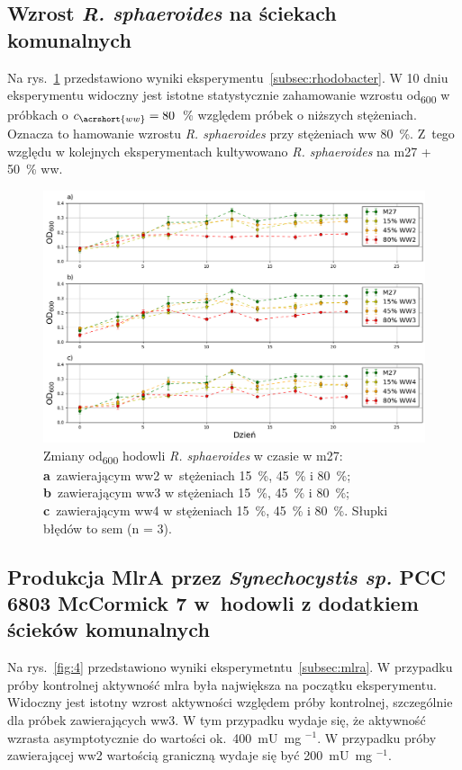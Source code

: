 \subsection{Wzrost \textit{R. sphaeroides} na ściekach komunalnych}\label{subsec:rhodobacter2}
Na rys.~\ref{fig:2} przedstawiono wyniki
eksperymentu~\ref{subsec:rhodobacter}.
W 10 dniu eksperymentu widoczny jest istotne
statystycznie zahamowanie wzrostu \acrshort{od}\textsubscript{600}
w próbkach o $c_{\acrshort{ww}} = 80$~\% względem próbek
o niższych stężeniach.
Oznacza to hamowanie wzrostu \textit{R. sphaeroides}
przy stężeniach \acrshort{ww} 80~\%.
Z~tego względu w kolejnych eksperymentach kultywowano
\textit{R. sphaeroides} na \acrshort{m27} + 50~\% \acrshort{ww}\@.\\

\begin{figure}[t!]
    \centering
    \includegraphics[width=12.5cm]{figures/ww}
    \caption{
        Zmiany \acrshort{od}\textsubscript{600} hodowli \textit{R. sphaeroides}
        w czasie w \acrshort{m27}:
        \textbf{a}~zawierającym \acrshort{ww}2 w~stężeniach 15~\%, 45~\% i 80~\%;
        \textbf{b}~zawierającym \acrshort{ww}3 w stężeniach 15~\%, 45~\% i 80~\%;
        \textbf{c}~zawierającym \acrshort{ww}4 w stężeniach 15~\%, 45~\% i 80~\%.
        Słupki błędów to \acrshort{sem} (n = 3).
    }
    \label{fig:2}
\end{figure}

\subsection{Produkcja MlrA przez \textit{Synechocystis sp.} PCC 6803 McCormick 7 w~hodowli z dodatkiem ścieków komunalnych}\label{subsec:mlra2}
Na rys.~\ref{fig:4} przedstawiono wyniki eksperymetntu~\ref{subsec:mlra}.
W przypadku próby kontrolnej aktywność \acrshort{mlra} była
największa na początku eksperymentu.
Widoczny jest istotny wzrost aktywności względem próby kontrolnej,
szczególnie dla próbek zawierających \acrshort{ww}3.
W tym przypadku wydaje się, że aktywność wzrasta asymptotycznie
do wartości ok.\ 400~mU~mg $^{-1}$.
W przypadku próby zawierającej \acrshort{ww}2 wartością
graniczną wydaje się być 200~mU~mg $^{-1}$.

